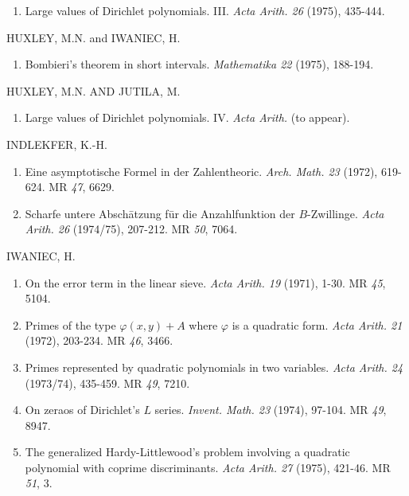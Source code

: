 \begin{thebibliography}{99}
\begin{enumerate}
\item Large values of Dirichlet polynomials. III. \textit{Acta
  Arith. 26} (1975), 435-444.
\end{enumerate}

 HUXLEY, M.N. and IWANIEC, H.
\begin{enumerate}
\item Bombieri's theorem in short intervals. \textit{Mathematika 22}
  (1975), 188-194.
\end{enumerate}

 HUXLEY, M.N. AND JUTILA, M.
\begin{enumerate}
\item Large values of Dirichlet polynomials. IV. \textit{Acta Arith.}
  (to appear). 
\end{enumerate}

 INDLEKFER, K.-H.
\begin{enumerate}
\item Eine asymptotische Formel in der
  Zahlentheoric. \textit{Arch. Math. 23} (1972), 619-624. MR {\em 47},
  6629.

\item Scharfe untere Absch\=atzung f\=ur die Anzahlfunktion der
  $B$-Zwillinge. \textit{Acta Arith. 26} (1974/75), 207-212. MR {\em
  50}, 7064.
\end{enumerate}

 IWANIEC, H.
\begin{enumerate}
\item On the error term in the linear sieve. \textit{Acta
  Arith. 19} (1971), 1-30. MR {\em 45}, 5104. 

\item Primes of the type $\varphi(x,y)+A$ where $\varphi$ is a
  quadratic form. \textit{Acta Arith. 21} (1972), 203-234. MR {\em
    46}, 3466. 

\item Primes represented by quadratic polynomials in two
  variables. \textit{Acta Arith. 24} (1973/74), 435-459. MR {\em 49},
  7210.  

\item On zeraos of Dirichlet's $L$
  series. \textit{Invent. Math. 23} (1974), 97-104. MR {\em 49}, 8947. 

\item The generalized Hardy-Littlewood's problem involving a quadratic
  polynomial with coprime discriminants. \textit{Acta
    Arith. 27} (1975), 421-46. MR {\em 51}, 3. 


\end{enumerate}
\end{thebibliography}
